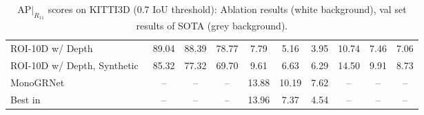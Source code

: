 \documentclass[10pt,twocolumn,letterpaper]{article}
\begin{document}
\begin{table*}[t]
{\begin{tabular}{l|ccc|ccc|ccc}
        \rowcolor[gray]{\gc}
        ROI-10D w/ Depth~\cite{Manhardt_2019_CVPR} & 89.04 & 88.39 & 78.77 & 7.79 & 5.16 & 3.95 & 10.74 & 7.46 & 7.06 \\
        \rowcolor[gray]{\gc}
        ROI-10D w/ Depth, Synthetic~\cite{Manhardt_2019_CVPR} & 85.32 & 77.32 & 69.70 & 9.61 & 6.63 & 6.29 & 14.50 & 9.91 & 8.73 \\
        \rowcolor[gray]{\gc}
        MonoGRNet~\cite{qin2019monogrnet} & -- & -- & -- & 13.88 & 10.19 & 7.62 & -- & -- & -- \\
        \rowcolor[gray]{\gc}
        Best in~\cite{Barabanau_arXiv_2019} & -- & -- & -- & 13.96 & 7.37 & 4.54 & -- & -- & -- \\
        \bottomrule
    \end{tabular}}
    \vspace{-0.5em}
    \caption{$\text{AP}|_{R_{11}}$ scores on KITTI3D (0.7 IoU threshold): Ablation results (white background), val set results of SOTA (grey background).}
    \label{tab:ablation-old-metric}
    \vspace{-1em}
\end{table*}
\end{document}
